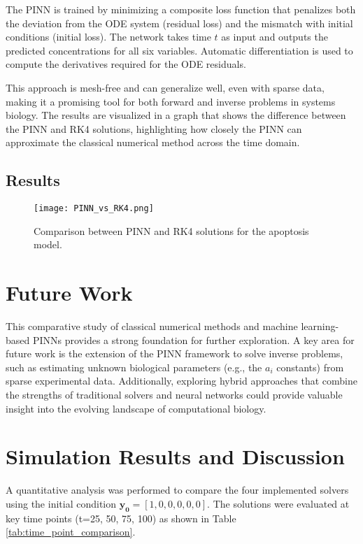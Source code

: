 \documentclass[conference]{IEEEtran}
\begin{document}
The PINN is trained by minimizing a composite loss function that penalizes both the deviation from the ODE system (residual loss) and the mismatch with initial conditions (initial loss). The network takes time $t$ as input and outputs the predicted concentrations for all six variables. Automatic differentiation is used to compute the derivatives required for the ODE residuals.

This approach is mesh-free and can generalize well, even with sparse data, making it a promising tool for both forward and inverse problems in systems biology. The results are visualized in a graph that shows the difference between the PINN and RK4 solutions, highlighting how closely the PINN can approximate the classical numerical method across the time domain.

\subsection{Results}
\begin{figure}[htbp]
\centerline{\texttt{[image: PINN\_vs\_RK4.png]}}
\caption{Comparison between PINN and RK4 solutions for the apoptosis model.}
\label{fig:pinn_vs_rk4}
\end{figure}
\section{Future Work}
This comparative study of classical numerical methods and machine learning-based PINNs provides a strong foundation for further exploration. A key area for future work is the extension of the PINN framework to solve inverse problems, such as estimating unknown biological parameters (e.g., the $a_i$ constants) from sparse experimental data. Additionally, exploring hybrid approaches that combine the strengths of traditional solvers and neural networks could provide valuable insight into the evolving landscape of computational biology.

\section{Simulation Results and Discussion}
A quantitative analysis was performed to compare the four implemented solvers using the initial condition $\mathbf{y_0} = [1, 0, 0, 0, 0, 0]$. The solutions were evaluated at key time points (t=25, 50, 75, 100) as shown in Table \ref{tab:time_point_comparison}.
\end{document}
